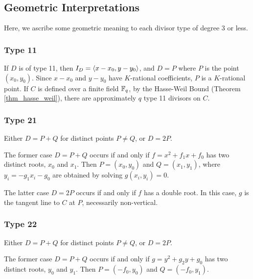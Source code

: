 
\subsection{Geometric Interpretations}

Here, we ascribe some geometric meaning to each divisor type of degree 3 or less.


\subsubsection{Type 11}
  If $D$ is of type 11, then $I_D = \left\langle x - x_0, y - y_0 \right\rangle$, and $D = P$ where $P$ is the point $(x_0, y_0)$.
  Since $x - x_0$ and $y - y_0$ have $K$-rational coefficients, $P$ is a $K$-rational point.
  If $C$ is defined over a finite field $\mathbb{F}_q$,
  by the Hasse-Weil Bound (Theorem \ref{thm_hasse_weil}), there are approximately $q$ type 11 divisors on $C$.

\subsubsection{Type 21}
  Either $D = P + Q$ for distinct points $P \neq Q$, or $D = 2P$.
  
  The former case $D = P + Q$ occurs if and only if $f = x^2 + f_1x + f_0$ has two distinct roots, $x_0$ and $x_1$.
  Then $P = (x_0, y_0)$ and $Q = (x_1, y_1)$, where $y_i = -g_1x_i - g_0$ are obtained by solving $g(x_i, y_i) = 0$.
  
  The latter case $D = 2P$ occurs if and only if $f$ has a double root.
  In this case, $g$ is the tangent line to $C$ at $P$, necessarily non-vertical.

\subsubsection{Type 22}
  Either $D = P + Q$ for distinct points $P \neq Q$, or $D = 2P$.

  The former case $D = P + Q$ occurs if and only if $g = y^2 + g_2y + g_0$ has two distinct roots, $y_0$ and $y_1$.
  Then $P = (-f_0, y_0)$ and $Q = (-f_0, y_1)$.

